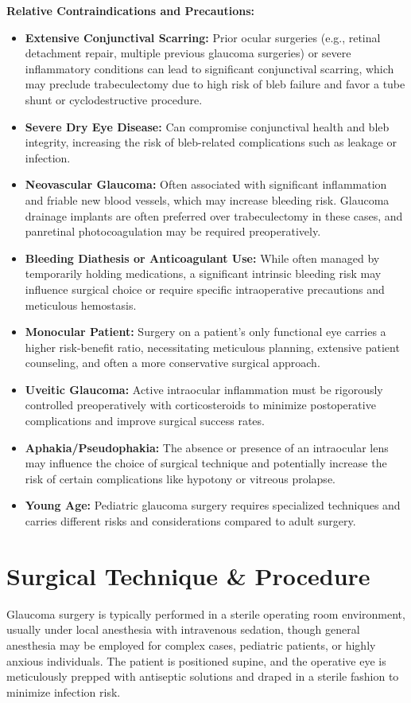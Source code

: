 \textbf{Relative Contraindications and Precautions:}
\begin{itemize}
  \item \textbf{Extensive Conjunctival Scarring:} Prior ocular surgeries (e.g., retinal detachment repair, multiple previous glaucoma surgeries) or severe inflammatory conditions can lead to significant conjunctival scarring, which may preclude trabeculectomy due to high risk of bleb failure and favor a tube shunt or cyclodestructive procedure.
  \item \textbf{Severe Dry Eye Disease:} Can compromise conjunctival health and bleb integrity, increasing the risk of bleb-related complications such as leakage or infection.
  \item \textbf{Neovascular Glaucoma:} Often associated with significant inflammation and friable new blood vessels, which may increase bleeding risk. Glaucoma drainage implants are often preferred over trabeculectomy in these cases, and panretinal photocoagulation may be required preoperatively.
  \item \textbf{Bleeding Diathesis or Anticoagulant Use:} While often managed by temporarily holding medications, a significant intrinsic bleeding risk may influence surgical choice or require specific intraoperative precautions and meticulous hemostasis.
  \item \textbf{Monocular Patient:} Surgery on a patient's only functional eye carries a higher risk-benefit ratio, necessitating meticulous planning, extensive patient counseling, and often a more conservative surgical approach.
  \item \textbf{Uveitic Glaucoma:} Active intraocular inflammation must be rigorously controlled preoperatively with corticosteroids to minimize postoperative complications and improve surgical success rates.
  \item \textbf{Aphakia/Pseudophakia:} The absence or presence of an intraocular lens may influence the choice of surgical technique and potentially increase the risk of certain complications like hypotony or vitreous prolapse.
  \item \textbf{Young Age:} Pediatric glaucoma surgery requires specialized techniques and carries different risks and considerations compared to adult surgery.
\end{itemize}

\section*{Surgical Technique \& Procedure}
Glaucoma surgery is typically performed in a sterile operating room environment, usually under local anesthesia with intravenous sedation, though general anesthesia may be employed for complex cases, pediatric patients, or highly anxious individuals. The patient is positioned supine, and the operative eye is meticulously prepped with antiseptic solutions and draped in a sterile fashion to minimize infection risk.

